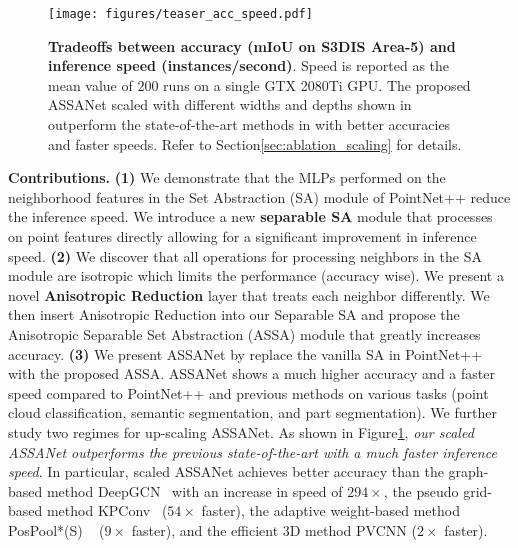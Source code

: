 \documentclass{article}
\newcommand{\figLabel}{Figure\xspace}
\newcommand{\secLabel}{Section\xspace}
\newcommand{\mysection}[1]{\vspace{3pt}\noindent\textbf{#1.}}
\begin{document}
\begin{figure}
  \begin{minipage}[c]{0.40\textwidth}
    \texttt{[image: figures/teaser\_acc\_speed.pdf]}
  \end{minipage}\hfill
  \begin{minipage}[c]{0.50\textwidth}
    \caption{
        \textbf{Tradeoffs between accuracy (mIoU on S3DIS Area-5) and inference speed (instances/second)}. Speed is reported as the mean value of $200$ runs on a single GTX 2080Ti GPU. The proposed ASSANet scaled with different widths and depths shown in \protect{} outperform the state-of-the-art methods in \protect{} with better accuracies and faster speeds. Refer to \secLabel \ref{sec:ablation_scaling} for details. 
    }
    \label{fig:acc-latency}
  \end{minipage}
  \vspace{-5mm}
\end{figure}


\mysection{Contributions}
\textbf{(1)} We demonstrate that the MLPs performed on the neighborhood features in the Set Abstraction (SA) module of PointNet++ reduce the inference speed. We introduce a new \textbf{separable SA} module that processes on point features directly allowing for a significant improvement in inference speed. 
\textbf{(2)} We discover that all operations for processing neighbors in the SA module are isotropic which limits the performance (accuracy wise). We present a novel \textbf{Anisotropic Reduction} layer that treats each neighbor differently. We then insert Anisotropic Reduction into our Separable SA and propose the Anisotropic Separable Set Abstraction (ASSA) module that greatly increases accuracy.
\textbf{(3)} We present ASSANet by replace the vanilla SA in PointNet++ with the proposed ASSA. ASSANet shows a much higher accuracy and a faster speed compared to PointNet++ and previous methods on various tasks (point cloud classification, semantic segmentation, and part segmentation). We further study two regimes for up-scaling ASSANet. As shown in \figLabel \ref{fig:acc-latency}, \textit {our scaled ASSANet outperforms the previous state-of-the-art with a much faster inference speed}. In particular, scaled ASSANet achieves better accuracy than the graph-based method DeepGCN~\cite{Li2019DeepGCNs} with an increase in speed of $294\times$, the pseudo grid-based method KPConv~\cite{Thomas2019KPConvFA} ($54\times $ faster), the adaptive weight-based method PosPool*(S) ~\cite{Liu2020ACL} ($9\times $ faster), and the efficient 3D method PVCNN \cite{Liu2019PointVoxelCF} ($2 \times$ faster).  
\end{document}
